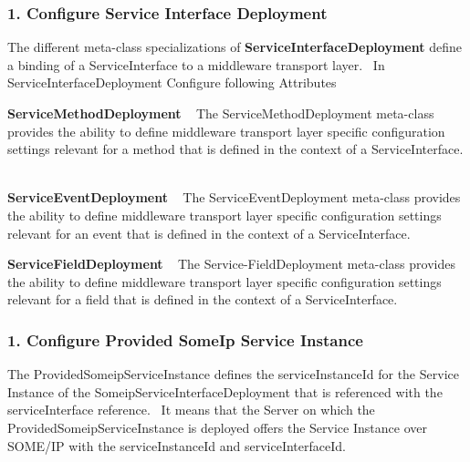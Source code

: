  \subsubsection*{1. Configure Service Interface Deployment}

The different meta-\/class specializations of {\bfseries Service\+Interface\+Deployment} define a binding of a Service\+Interface to a middleware transport layer.~\newline
 In Service\+Interface\+Deployment Configure following Attributes ~\newline

\begin{DoxyItemize}
\item {\bfseries Service\+Method\+Deployment} ~\newline
 The Service\+Method\+Deployment meta-\/class provides the ability to define middleware transport layer specific configuration settings relevant for a method that is defined in the context of a Service\+Interface. ~\newline

\item {\bfseries Service\+Event\+Deployment} ~\newline
 The Service\+Event\+Deployment meta-\/class provides the ability to define middleware transport layer specific configuration settings relevant for an event that is defined in the context of a Service\+Interface. ~\newline

\item {\bfseries Service\+Field\+Deployment} ~\newline
 The Service-\/\+Field\+Deployment meta-\/class provides the ability to define middleware transport layer specific configuration settings relevant for a field that is defined in the context of a Service\+Interface. ~\newline

\end{DoxyItemize}

 \subsubsection*{1. Configure Provided Some\+Ip Service Instance}

The Provided\+Someip\+Service\+Instance defines the service\+Instance\+Id for the Service Instance of the Someip\+Service\+Interface\+Deployment that is referenced with the service\+Interface reference.~\newline
 It means that the Server on which the Provided\+Someip\+Service\+Instance is deployed offers the Service Instance over S\+O\+M\+E/\+IP with the service\+Instance\+Id and service\+Interface\+Id.

